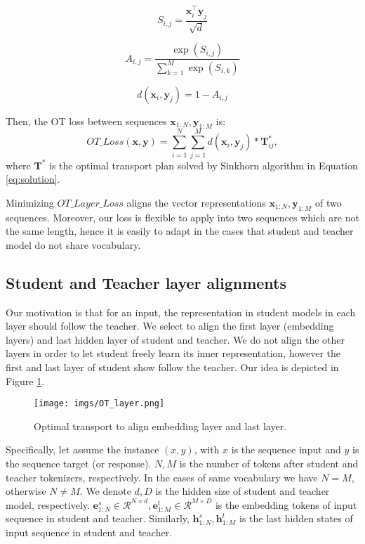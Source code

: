 \begin{equation}
    S_{i,j} = \frac{\mathbf{x}_i^\top \mathbf{y}_j}{\sqrt{d}}
\end{equation}

\begin{equation}
    A_{i,j} = \frac{\exp(S_{i,j})}{\sum_{k=1}^{M} \exp(S_{i,k})}
\end{equation}

\begin{equation}
    d(\mathbf{x}_i, \mathbf{y}_j) = 1 - A_{i,j}
\end{equation}

Then, the OT loss between sequences $\textbf{x}_{1:N}, \textbf{y}_{1:M}$ is:
\begin{equation}
    OT\_Loss(\textbf{x}, \textbf{y}) = \sum_{i=1}^N \sum_{j=1}^M d(\textbf{x}_i, \textbf{y}_j) * \mathbf{T}_{ij}^*,
    \label{eq:ot_layer_loss}
\end{equation}
where $\mathbf{T}^*$ is the optimal transport plan solved by Sinkhorn algorithm in Equation \ref{eq:solution}.

Minimizing $OT\_Layer\_Loss$ aligns the vector representations $\textbf{x}_{1:N}, \textbf{y}_{1:M}$ of two sequences. Moreover, our loss is flexible to apply into two sequences which are not the same length, hence it is easily to adapt in the cases that student and teacher model do not share vocabulary.

\subsection{Student and Teacher layer alignments}

Our motivation is that for an input, the representation in student models in each layer should follow the teacher. We select to align the first layer (embedding layers) and last hidden layer of student and teacher. We do not align the other layers in order to let student freely learn its inner representation, however the first and last layer of student show follow the teacher. Our idea is depicted in Figure \ref{fig:ot_layer}.

\begin{figure}[t]
    \centering
    \texttt{[image: imgs/OT\_layer.png]}
    \caption{Optimal transport to align embedding layer and last layer.}
    \label{fig:ot_layer}
\end{figure}

Specifically, let assume the instance $(x,y)$, with $x$ is the sequence input and $y$ is the sequence target (or response). $N, M$ is the number of tokens after student and teacher tokenizers, respectively. In the cases of same vocabulary we have $N=M$, otherwise $N \neq M$. We denote $d, D$ is the hidden size of student and teacher model, respectively. $\mathbf{e}_{1:N}^s \in \mathcal{R}^{N\times d}, \mathbf{e}_{1:M}^t \in \mathcal{R}^{M \times D}$ is the embedding tokens of input sequence in student and teacher. Similarly, $\mathbf{h}_{1:N}^s, \mathbf{h}_{1:M}^t$ is the last hidden states of input sequence in student and teacher. 

